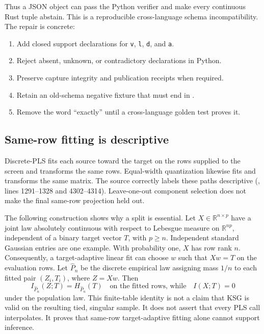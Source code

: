 \documentclass[11pt]{article}
\begin{document}
Thus a JSON object can pass the Python verifier and make every continuous Rust
tuple abstain.  This is a reproducible cross-language schema incompatibility.
The repair is concrete:

\begin{enumerate}
\item Add closed support declarations for \texttt{v}, \texttt{l}, \texttt{d}, and \texttt{a}.
\item Reject absent, unknown, or contradictory declarations in Python.
\item Preserve capture integrity and publication receipts when required.
\item Retain an old-schema negative fixture that must end in .
\item Remove the word ``exactly'' until a cross-language golden test proves it.
\end{enumerate}

\subsection{Same-row fitting is descriptive}

Discrete-PLS fits each source toward the target on the rows supplied to the
screen and transforms the same rows.  Equal-width quantization likewise fits and
transforms the same matrix.  The source correctly labels these paths descriptive
(, lines 1291--1328 and
4302--4314).  Leave-one-out component selection does not make the final same-row
projection held out.

The following construction shows why a split is essential.  Let
$X\in\mathbb{R}^{n\times p}$ have a joint law absolutely continuous with respect to Lebesgue
measure on $\mathbb{R}^{np}$, independent of a binary target vector $T$, with $p\geq n$.
Independent standard Gaussian entries are one example.  With probability one, $X$ has row rank $n$.
Consequently, a target-adaptive linear fit can choose $w$ such that $Xw=T$ on
the evaluation rows.  Let $\widehat P_n$ be the discrete empirical law assigning
mass $1/n$ to each fitted pair $(Z_i,T_i)$, where $Z=Xw$.  Then
\[
  I_{\widehat P_n}(Z;T)=H_{\widehat P_n}(T)
  \quad\text{on the fitted rows, while}\quad
  I(X;T)=0
\]
under the population law.  This finite-table identity is not a claim that KSG
is valid on the resulting tied, singular sample.  It does not assert that every
PLS call interpolates.  It proves that same-row target-adaptive fitting alone
cannot support inference.
\end{document}
